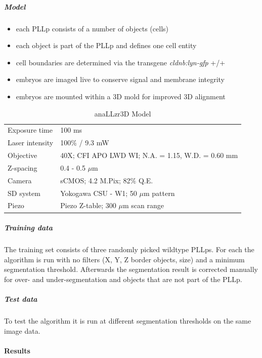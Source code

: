 \documentclass[11pt,singlespacinge,twoside]{reedthesis} %
\providecommand{\tightlist}{%
  \setlength{\itemsep}{0pt}\setlength{\parskip}{0pt}}
\begin{document}
\hypertarget{model-1}{%
\subparagraph{Model}\label{model-1}}
\begin{itemize}
\tightlist
\item
  each PLLp consists of a number of objects (cells)
\item
  each object is part of the PLLp and defines one cell entity
\item
  cell boundaries are determined via the transgene \emph{cldnb:lyn-gfp} +/+
\item
  embryos are imaged live to conserve signal and membrane integrity
\item
  embryos are mounted within a 3D mold for improved 3D alignment
\end{itemize}
\begin{table}[!h]

\caption{\label{tab:model3DGrT}anaLLzr3D Model}
\centering
\begin{tabu} to 
\toprule
{}  Exposure time & 100 ms\\
Laser intensity & 100$\%$ / 9.3 mW\\
  Objective & 40X; CFI APO LWD WI; N.A. = 1.15, W.D. = 0.60 mm\\
Z-spacing & 0.4 - 0.5 $\mu$m\\
  Camera & sCMOS; 4.2 M.Pix; 82$\%$ Q.E.\\
\addlinespace
SD system & Yokogawa CSU - W1; 50 $\mu$m pattern\\
  Piezo & Piezo Z-table; 300 $\mu$m scan range\\
\bottomrule
\end{tabu}
\end{table}
\hypertarget{training-data-1}{%
\subparagraph{Training data}\label{training-data-1}}

The training set consists of three randomly picked wildtype PLLps. For each the algorithm is run with no filters (X, Y, Z border objects, size) and a minimum segmentation threshold. Afterwards the segmentation result is corrected manually for over- and under-segmentation and objects that are not part of the PLLp.

\hypertarget{test-data-1}{%
\subparagraph{Test data}\label{test-data-1}}

To test the algorithm it is run at different segmentation thresholds on the same image data.

\hypertarget{results-1}{%
\paragraph{Results}\label{results-1}}
\end{document}
